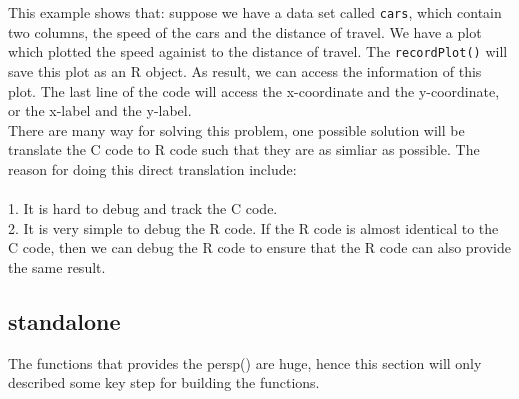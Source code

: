 \documentclass[a4paper,10pt]{article}\usepackage[]{graphicx}\usepackage[]{color}
\begin{document}
This example shows that: suppose we have a data set called \texttt{cars}, which contain two columns, the speed of the cars and the distance of travel. We have a plot which plotted the speed againist to the distance of travel. The \texttt{recordPlot()} will save this plot as an R object. As result, we can access the information of this plot. The last line of the code will access the x-coordinate and the y-coordinate, or the x-label and the y-label. \\

There are many way for solving this problem, one possible solution will be translate the C code to R code such that they are as simliar as possible. The reason for doing this direct translation include: \\\\
1. It is hard to debug and track the C code. \\
2. It is very simple to debug the R code. If the R code is almost identical to the C code, then we can debug the R code to ensure that the R code can also provide the same result. \\

\subsection{standalone}
The functions that provides the persp() are huge, hence this section will only described some key step for building the functions.
\end{document}
